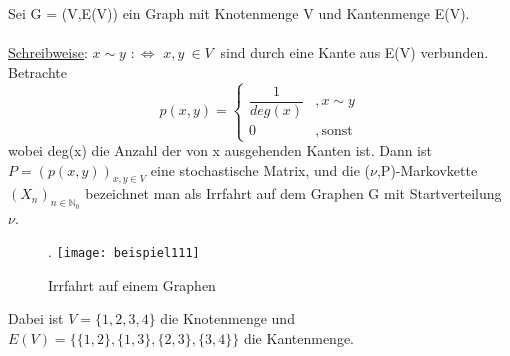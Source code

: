 Sei G = (V,E(V)) ein Graph mit Knotenmenge V und Kantenmenge E(V).
\\
\\
\underline{Schreibweise}: $x \sim y$ $:\Leftrightarrow$ $x,y \: \in V \:$ sind durch eine Kante aus E(V) verbunden. Betrachte
\begin{equation*}
p(x,y)=
\begin{cases}
\dfrac{1}{deg(x)} &  ,x \sim y\\
0 & ,\mathrm{sonst}
\end{cases}
\end{equation*}
wobei deg(x) die Anzahl der von x ausgehenden Kanten ist. Dann ist $P =(p(x,y))_{x,y \in V}$ eine stochastische Matrix, und die ($\nu$,P)-Markovkette  $(X_{n})_{n \in \mathbb{N}_{0}}$ bezeichnet man als Irrfahrt auf dem Graphen G mit Startverteilung $\nu$. 
\begin{figure}[H].
\centering
\texttt{[image: beispiel111]}
\caption{Irrfahrt auf einem Graphen}
\end{figure}
\noindent
Dabei ist $V = \lbrace 1,2,3,4 \rbrace$ die Knotenmenge und $E(V) = \lbrace \lbrace 1,2 \rbrace, \lbrace 1,3 \rbrace, \lbrace 2,3 \rbrace, \lbrace 3,4 \rbrace \rbrace$ die Kantenmenge.